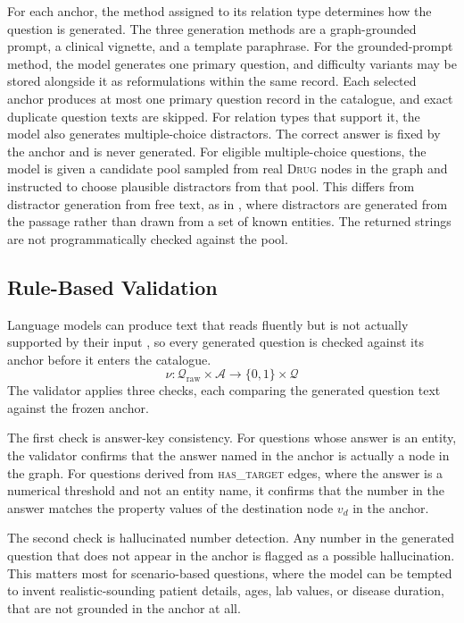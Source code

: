 For each anchor, the method assigned to its relation type determines how the
question is generated. The three generation methods are a graph-grounded
prompt, a clinical vignette, and a template paraphrase. For the grounded-prompt
method, the model generates one primary question, and difficulty variants may
be stored alongside it as reformulations within the same record. Each selected
anchor produces at most one primary question record in the catalogue, and exact
duplicate question texts are skipped. For relation types that support it, the
model also generates multiple-choice distractors. The correct answer is fixed
by the anchor and is never generated. For eligible multiple-choice questions,
the model is given a candidate pool sampled from real \textsc{Drug} nodes in
the graph and instructed to choose plausible distractors from that pool. This
differs from distractor generation from free text, as in \cite{gao2019}, where
distractors are generated from the passage rather than drawn from a set of
known entities. The returned strings are not programmatically checked against
the pool.

\subsection{Rule-Based Validation}
\label{sec:validation}

Language models can produce text that reads fluently but is not actually supported by their input \cite{huang2025}, so every generated question is checked against its anchor before it enters the catalogue.
$$\nu: \mathcal{Q}_{\text{raw}} \times \mathcal{A} \rightarrow \{0, 1\} \times \mathcal{Q}$$
The validator applies three checks, each comparing the generated question text against the frozen anchor.

The first check is answer-key consistency. For questions whose answer is an entity, the validator confirms that the answer named in the anchor is actually a node in the graph. For questions derived from \textsc{has\_target} edges, where the answer is a numerical threshold and not an entity name, it confirms that the number in the answer matches the property values of the destination node $v_d$ in the anchor.

The second check is hallucinated number detection. Any number in the generated question that does not appear in the anchor is flagged as a possible hallucination. This matters most for scenario-based questions, where the model can be tempted to invent realistic-sounding patient details, ages, lab values, or disease duration, that are not grounded in the anchor at all.

